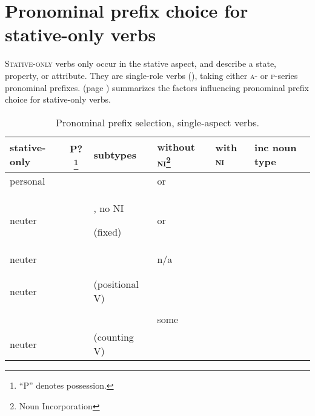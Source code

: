 \chapter{Pronominal prefix choice for stative-only verbs} \label{Pronominal prefix choice for stative-only verbs}
\textsc{Stative-only} verbs only occur in the stative aspect, and describe a state, property, or attribute. They are single-role verbs (), taking either \textsc{a}- or \textsc{p}-series pronominal prefixes.  (page \pageref{figtab:1:pponeaspv}) summarizes the factors influencing pronominal prefix choice for stative-only verbs. 

\begin{table}
\small
\caption{Pronominal prefix selection, single-aspect verbs.\label{figtab:1:pponeaspv}}
\begin{tabularx}{\textwidth}{lcQQQQ}

\lsptoprule
stative-only & P?\footnote{“P” denotes possession.} & subtypes & without \textsc{ni}\footnote{Noun Incorporation} & with \textsc{ni} & inc noun type\\\midrule
personal &  &  &  or  &  & \\
\addlinespace
\midrule
neuter &  & , no NI

 (fixed)
&  or  &  & \\
\addlinespace
\midrule
neuter &  &  

 &  

n/a & 

 & 

\\
&&&&&\\
&  &  &  &  &  \\
\addlinespace
\midrule
neuter &  &  

(positional V) &  

 &  

 & 

\\
&&&&&\\
&  &  & some  &  & \\
\addlinespace
\midrule
neuter &  &  

(counting V) &  &  


\end{tabularx}
\end{table}
